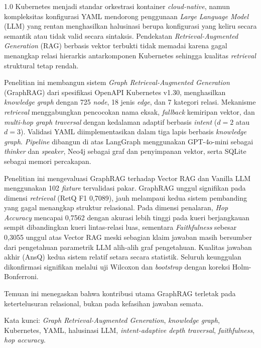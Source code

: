 \begin{spacing}{1.0}
Kubernetes menjadi standar orkestrasi kontainer \textit{cloud-native}, namun kompleksitas konfigurasi YAML mendorong penggunaan \textit{Large Language Model} (LLM) yang rentan menghasilkan halusinasi berupa konfigurasi yang keliru secara semantik atau tidak valid secara sintaksis. Pendekatan \textit{Retrieval-Augmented Generation} (RAG) berbasis vektor terbukti tidak memadai karena gagal menangkap relasi hierarkis antarkomponen Kubernetes sehingga kualitas \textit{retrieval} struktural tetap rendah.

\begin{sloppypar}
Penelitian ini membangun sistem \textit{Graph Retrieval-\allowbreak{}Augmented Generation} (GraphRAG) dari spesifikasi OpenAPI Kubernetes v1.30, menghasilkan \textit{knowledge graph} dengan 725 \textit{node}, 18 jenis \textit{edge}, dan 7 kategori relasi. Mekanisme \textit{retrieval} menggabungkan pencocokan nama eksak, \textit{fallback} kemiripan vektor, dan \textit{multi-hop graph traversal} dengan kedalaman adaptif berbasis \textit{intent} ($d = 2$ atau $d = 3$). Validasi YAML diimplementasikan dalam tiga lapis berbasis \textit{knowledge graph}. \textit{Pipeline} dibangun di atas LangGraph menggunakan GPT-4o-mini sebagai \textit{thinker} dan \textit{speaker}, Neo4j sebagai graf dan penyimpanan vektor, serta SQLite sebagai memori percakapan.
\end{sloppypar}

Penelitian ini mengevaluasi GraphRAG terhadap Vector RAG dan Vanilla LLM menggunakan 102 \textit{fixture} tervalidasi pakar. GraphRAG unggul signifikan pada dimensi \textit{retrieval} (RetQ F1 0,7089), jauh melampaui kedua sistem pembanding yang gagal menangkap struktur relasional. Pada dimensi penalaran, \textit{Hop Accuracy} mencapai 0,7562 dengan akurasi lebih tinggi pada kueri berjangkauan sempit dibandingkan kueri lintas-relasi luas, sementara \textit{Faithfulness} sebesar 0,3055 unggul atas Vector RAG meski sebagian klaim jawaban masih bersumber dari pengetahuan parametrik LLM alih-alih graf pengetahuan. Kualitas jawaban akhir (AnsQ) kedua sistem relatif setara secara statistik. Seluruh keunggulan dikonfirmasi signifikan melalui uji Wilcoxon dan \textit{bootstrap} dengan koreksi Holm-Bonferroni.

Temuan ini menegaskan bahwa kontribusi utama GraphRAG terletak pada ketertelusuran relasional, bukan pada kefasihan jawaban semata.

Kata kunci: \textit{Graph Retrieval-Augmented Generation}, \textit{knowledge graph}, Kubernetes, YAML, halusinasi LLM, \textit{intent-adaptive depth traversal}, \textit{faithfulness}, \textit{hop accuracy}.
\end{spacing}
